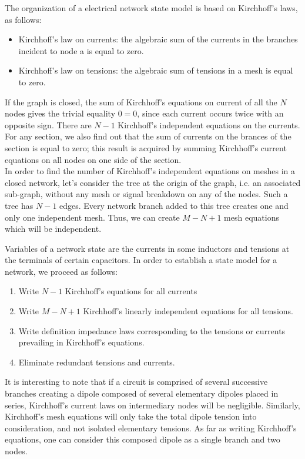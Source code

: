 The organization of a electrical network state model is based on Kirchhoff’s laws, as follows:
\begin{itemize}
\item Kirchhoff’s law on currents:  the algebraic sum of the currents in the branches incident to node a is equal to zero.
\item Kirchhoff’s law on tensions:  the algebraic sum of tensions in a mesh is equal to zero.
\end{itemize}

If the graph is closed, the sum of Kirchhoff’s equations on current of all the $N$ nodes gives the trivial equality $0 = 0$, since each current occurs twice with an opposite sign.  There are $N-1$ Kirchhoff’s independent equations on the currents.  For any section, we also find out that the sum of currents on the brances of the section is equal to zero;  this result is acquired by summing Kirchhoff’s current equations on all nodes on one side of the section.\\

In order to find the number of Kirchhoff’s independent equations on meshes in a closed network, let’s consider the tree at the origin of the graph, i.e. an associated sub-graph, without any mesh or signal breakdown on any of the nodes.  Such a tree has $N - 1$ edges.  Every network branch added to this tree creates one and only one independent mesh.  Thus, we can create $M-N + 1$ mesh equations which will be independent.

Variables of a network state are the currents in some inductors and tensions at the terminals of certain capacitors. In order to establish a state model for a network, we proceed as follows:
\begin{enumerate}
\item Write $N - 1$ Kirchhoff’s equations for all currents
\item Write $M - N +1$ Kirchhoff’s linearly independent equations for all tensions.
\item Write definition impedance laws corresponding to the tensions or currents prevailing in Kirchhoff’s equations.
\item 	Eliminate redundant tensions and currents.
\end{enumerate}

It is interesting to note that if a circuit is comprised of several successive branches creating a dipole composed of several elementary dipoles placed in series, Kirchhoff’s current laws on intermediary nodes will be negligible.  Similarly, Kirchhoff’s mesh equations will only take the total dipole tension into consideration, and not isolated elementary tensions.  As far as writing Kirchhoff’s equations, one can consider this composed dipole as a single branch and two nodes.\\

